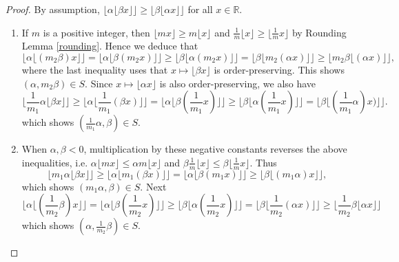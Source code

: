 \documentclass[12pt,letterpaper, reqno]{amsart}
\theoremstyle{definition}
\theoremstyle{remark}
\newcommand{\RR}{\ensuremath{\mathbb{R}}}
\newcommand{\floor}[1]{\lfloor{#1}\rfloor}
\begin{document}
\begin{proof}
By assumption, $\floor{\alpha \floor{\beta x}}\geq \floor{\beta\floor{\alpha x}}$ for all $x\in\RR$.
\begin{enumerate}
\item 
 If $m$ is a positive integer, then $\floor{mx}\geq m\floor{x}$ and 
$\frac{1}{m}\floor{ x}\geq \floor{\frac1m x}$ by Rounding Lemma \ref{rounding}. Hence we deduce that
\[
 \floor{\alpha\floor{(m_2\beta) x}}=\floor{\alpha \floor{\beta (m_2x)}}\geq \floor{\beta\floor{\alpha (m_2x)}} = \floor{\beta\floor{m_2(\alpha x)}}
 \geq\floor{m_2\beta \floor{(\alpha x)}}, 
  \]
where the last inequality uses that $x\mapsto \floor{\beta x}$ is order-preserving. This shows $(\alpha, m_2 \beta) \in S$. Since $x\mapsto \floor{\alpha x}$ is also order-preserving, we also have
\[ 
\floor{\frac{1}{m_1} \alpha\floor{\beta x}}\geq \floor{\alpha\floor{\frac{1}{m_1}(\beta x)}}=\floor{\alpha\floor{\beta(\frac{1}{m_1} x)}}\geq\floor{\beta\floor{ \alpha (\frac{1}{m_1} x)}} 
= \floor{\beta\floor{ (\frac{1}{m_1}\alpha)  x)}}.
\]
which shows $(\frac{1}{m_1} \alpha, \beta) \in S$.
\\
\item 
When $\alpha,\beta<0$, multiplication by these negative constants  reverses the above inequalities,
i.e. $\alpha \floor{mx}\leq\alpha m\floor{x}$ and $\beta\frac{1}{m}\floor{ x}\leq\beta\floor{\frac{1}{m} x}$. 
Thus
\[ \floor{m_1 \alpha\floor{\beta x}} 
\geq \floor{\alpha\floor{m_1(\beta x)}}
= \floor{\alpha\floor{\beta(m_1 x)}}
\geq \floor{\beta \floor{(m_1\alpha) x}  }, \]
which shows $(m_1 \alpha, \beta) \in S$. 
Next
\[ \floor{\alpha\floor{(\frac{1}{m_2} \beta) x}} =\floor{\alpha\floor{\beta(\frac{1}{m_2} x)}} 
\geq \floor{\beta\floor{ \alpha(\frac{1}{m_2} x)}} = \floor{\beta\floor{ \frac{1}{m_2} (\alpha x)}} \geq \floor{\frac{1}{m_2}\beta\floor{\alpha x}} \]
which shows $(\alpha, \frac{1}{m_2} \beta) \in S$.

\end{enumerate}
\end{proof}
\end{document}
